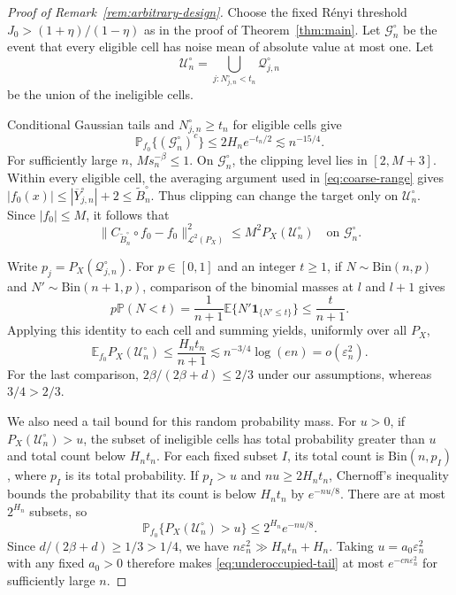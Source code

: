 \documentclass[11pt,a4paper]{article}
\theoremstyle{remark}
\newcommand{\Lcal}{\mathcal L}
\newcommand{\PP}{\mathbb P}
\newcommand{\E}{\mathbb E}
\newcommand{\norm}[1]{\lVert#1\rVert}
\begin{document}
\begingroup
\begin{proof}[Proof of Remark~\ref{rem:arbitrary-design}]
Choose the fixed R\'enyi threshold
$J_0>(1+\eta)/(1-\eta)$ as in the proof of Theorem~\ref{thm:main}.
Let $\mathcal G_n^{\circ}$ be the event that every eligible cell has
noise mean of absolute value at most one. Let
\[
\mathcal U_n^{\circ}
=\bigcup_{j:N_{j,n}^{\circ}<t_n}\mathcal Q_{j,n}^{\circ}
\]
be the union of the ineligible cells.

Conditional Gaussian tails and $N_{j,n}^{\circ}\geq t_n$ for
eligible cells give
\begin{equation}\label{eq:good-noise-bound}
\PP_{f_0}\{(\mathcal G_n^{\circ})^c\}
\leq2H_ne^{-t_n/2}\lesssim n^{-15/4}.
\end{equation}
For sufficiently large $n$, $Ms_n^{-\beta}\leq1$.
On $\mathcal G_n^{\circ}$, the clipping level lies in $[2,M+3]$.
Within every eligible cell, the averaging argument used in
\eqref{eq:coarse-range} gives
$|f_0(x)|\leq|\overline Y_{j,n}^{\circ}|+2
\leq\widetilde B_n^{\circ}$.
Thus clipping can change the target only on $\mathcal U_n^{\circ}$.
Since $|f_0|\leq M$, it follows that
\begin{equation}\label{eq:clipping-bias-mass}
\norm{C_{\widetilde B_n^{\circ}}\circ f_0-f_0}_{\Lcal^2(P_X)}^2
\leq M^2P_X(\mathcal U_n^{\circ})
\quad\text{on }\mathcal G_n^{\circ}.
\end{equation}

Write $p_j=P_X(\mathcal Q_{j,n}^{\circ})$.
For $p\in[0,1]$ and an integer $t\geq1$, if $N\sim\mathrm{Bin}(n,p)$ and
$N'\sim\mathrm{Bin}(n+1,p)$,
comparison of the binomial masses at $l$ and $l+1$ gives
\[
p\PP(N<t)=\frac1{n+1}\E\{N'\mathbf1_{\{N'\leq t\}}\}
\leq\frac{t}{n+1}.
\]
Applying this identity to each cell and summing yields, uniformly
over all $P_X$,
\begin{equation}\label{eq:underoccupied-mean}
\E_{f_0}P_X(\mathcal U_n^{\circ})
\leq\frac{H_nt_n}{n+1}
\lesssim n^{-3/4}\log(en)=o(\varepsilon_n^2).
\end{equation}
For the last comparison, $2\beta/(2\beta+d)\leq2/3$ under our
assumptions, whereas $3/4>2/3$.

We also need a tail bound for this random probability mass.
For $u>0$, if $P_X(\mathcal U_n^{\circ})>u$, the subset of ineligible cells has
total probability greater than $u$ and total count below $H_nt_n$.
For each fixed subset $I$, its total count is
$\mathrm{Bin}(n,p_I)$, where $p_I$ is its total probability.
If $p_I>u$ and $nu\geq2H_nt_n$, Chernoff's inequality bounds the
probability that its count is below $H_nt_n$ by $e^{-nu/8}$.
There are at most $2^{H_n}$ subsets, so
\begin{equation}\label{eq:underoccupied-tail}
\PP_{f_0}\{P_X(\mathcal U_n^{\circ})>u\}
\leq2^{H_n}e^{-nu/8}.
\end{equation}
Since $d/(2\beta+d)\geq1/3>1/4$, we have
$n\varepsilon_n^2\gg H_nt_n+H_n$.
Taking $u=a_0\varepsilon_n^2$ with any fixed $a_0>0$ therefore
makes \eqref{eq:underoccupied-tail} at most
$e^{-cn\varepsilon_n^2}$ for sufficiently large $n$.


\end{proof}
\end{document}
